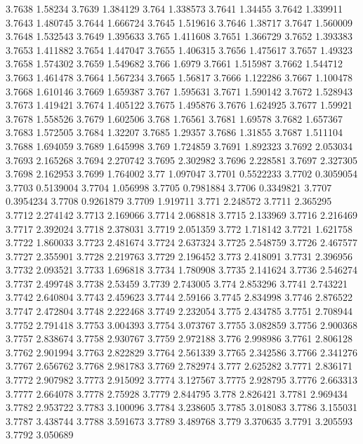 3.7638  1.58234
3.7639  1.384129
3.764  1.338573
3.7641  1.34455
3.7642  1.339911
3.7643  1.480745
3.7644  1.666724
3.7645  1.519616
3.7646  1.38717
3.7647  1.560009
3.7648  1.532543
3.7649  1.395633
3.765  1.411608
3.7651  1.366729
3.7652  1.393383
3.7653  1.411882
3.7654  1.447047
3.7655  1.406315
3.7656  1.475617
3.7657  1.49323
3.7658  1.574302
3.7659  1.549682
3.766  1.6979
3.7661  1.515987
3.7662  1.544712
3.7663  1.461478
3.7664  1.567234
3.7665  1.56817
3.7666  1.122286
3.7667  1.100478
3.7668  1.610146
3.7669  1.659387
3.767  1.595631
3.7671  1.590142
3.7672  1.528943
3.7673  1.419421
3.7674  1.405122
3.7675  1.495876
3.7676  1.624925
3.7677  1.59921
3.7678  1.558526
3.7679  1.602506
3.768  1.76561
3.7681  1.69578
3.7682  1.657367
3.7683  1.572505
3.7684  1.32207
3.7685  1.29357
3.7686  1.31855
3.7687  1.511104
3.7688  1.694059
3.7689  1.645998
3.769  1.724859
3.7691  1.892323
3.7692  2.053034
3.7693  2.165268
3.7694  2.270742
3.7695  2.302982
3.7696  2.228581
3.7697  2.327305
3.7698  2.162953
3.7699  1.764002
3.77  1.097047
3.7701  0.5522233
3.7702  0.3059054
3.7703  0.5139004
3.7704  1.056998
3.7705  0.7981884
3.7706  0.3349821
3.7707  0.3954234
3.7708  0.9261879
3.7709  1.919711
3.771  2.248572
3.7711  2.365295
3.7712  2.274142
3.7713  2.169066
3.7714  2.068818
3.7715  2.133969
3.7716  2.216469
3.7717  2.392024
3.7718  2.378031
3.7719  2.051359
3.772  1.718142
3.7721  1.621758
3.7722  1.860033
3.7723  2.481674
3.7724  2.637324
3.7725  2.548759
3.7726  2.467577
3.7727  2.355901
3.7728  2.219763
3.7729  2.196452
3.773  2.418091
3.7731  2.396956
3.7732  2.093521
3.7733  1.696818
3.7734  1.780908
3.7735  2.141624
3.7736  2.546274
3.7737  2.499748
3.7738  2.53459
3.7739  2.743005
3.774  2.853296
3.7741  2.743221
3.7742  2.640804
3.7743  2.459623
3.7744  2.59166
3.7745  2.834998
3.7746  2.876522
3.7747  2.472804
3.7748  2.222468
3.7749  2.232054
3.775  2.434785
3.7751  2.708944
3.7752  2.791418
3.7753  3.004393
3.7754  3.073767
3.7755  3.082859
3.7756  2.900368
3.7757  2.838674
3.7758  2.930767
3.7759  2.972188
3.776  2.998986
3.7761  2.806128
3.7762  2.901994
3.7763  2.822829
3.7764  2.561339
3.7765  2.342586
3.7766  2.341276
3.7767  2.656762
3.7768  2.981783
3.7769  2.782974
3.777  2.625282
3.7771  2.836171
3.7772  2.907982
3.7773  2.915092
3.7774  3.127567
3.7775  2.928795
3.7776  2.663313
3.7777  2.664078
3.7778  2.75928
3.7779  2.844795
3.778  2.826421
3.7781  2.969434
3.7782  2.953722
3.7783  3.100096
3.7784  3.238605
3.7785  3.018083
3.7786  3.155031
3.7787  3.438744
3.7788  3.591673
3.7789  3.489768
3.779  3.370635
3.7791  3.205593
3.7792  3.050689
